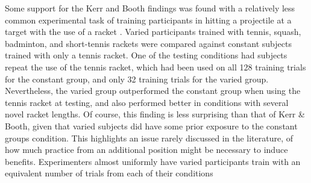 \documentclass[
  12pt,
  letterpaper,
]{article}
\begin{document}
Some support for the Kerr and Booth findings was found with a relatively
less common experimental task of training participants in hitting a
projectile at a target with the use of a racket
\autocite{greenPracticeVariabilityTransfer1995a}. Varied participants
trained with tennis, squash, badminton, and short-tennis rackets were
compared against constant subjects trained with only a tennis racket.
One of the testing conditions had subjects repeat the use of the tennis
racket, which had been used on all 128 training trials for the constant
group, and only 32 training trials for the varied group. Nevertheless,
the varied group outperformed the constant group when using the tennis
racket at testing, and also performed better in conditions with several
novel racket lengths. Of course, this finding is less surprising than
that of Kerr \& Booth, given that varied subjects did have some prior
exposure to the constant groups condition. This highlights an issue
rarely discussed in the literature, of how much practice from an
additional position might be necessary to induce benefits. Experimenters
almost uniformly have varied participants train with an equivalent
number of trials from each of their conditions
\end{document}
